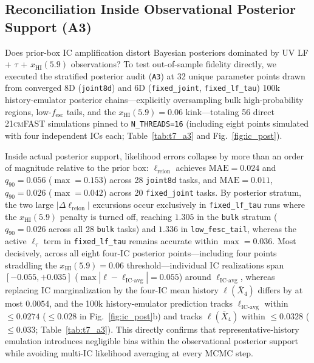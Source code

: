 \documentclass[aps,prd,reprint,superscriptaddress,nofootinbib,amsmath,amssymb,floatfix,longbibliography]{revtex4-2}
\begin{document}
\subsection{Reconciliation Inside Observational Posterior Support (A3)}\label{sec:a3}

Does prior-box IC amplification distort Bayesian posteriors dominated by UV LF + $\tau$ + $x_{\mathrm{HI}}(5.9)$ observations? To test out-of-sample fidelity directly, we executed the stratified posterior audit (\texttt{A3}) at 32 unique parameter points drawn from converged 8D (\texttt{joint8d}) and 6D (\texttt{fixed\_joint}, \texttt{fixed\_lf\_tau}) 100k history-emulator posterior chains---explicitly oversampling bulk high-probability regions, low-$f_{\mathrm{esc}}$ tails, and the $x_{\mathrm{HI}}(5.9)=0.06$ kink---totaling 56 direct \textsc{21cmFAST} simulations pinned to \texttt{N\_THREADS=16} (including eight points simulated with four independent ICs each; Table~\ref{tab:t7_a3} and Fig.~\ref{fig:ic_post}).

Inside actual posterior support, likelihood errors collapse by more than an order of magnitude relative to the prior box: $\ell_{\mathrm{reion}}$ achieves $\mathrm{MAE}=0.024$ and $q_{90}=0.056$ ($\max = 0.153$) across 28 \texttt{joint8d} tasks, and $\mathrm{MAE}=0.011$, $q_{90}=0.026$ ($\max = 0.042$) across 20 \texttt{fixed\_joint} tasks. By posterior stratum, the two large $|\Delta\ell_{\mathrm{reion}}|$ excursions occur exclusively in \texttt{fixed\_lf\_tau} runs where the $x_{\mathrm{HI}}(5.9)$ penalty is turned off, reaching $1.305$ in the \texttt{bulk} stratum ($q_{90}=0.026$ across all 28 \texttt{bulk} tasks) and $1.336$ in \texttt{low\_fesc\_tail}, whereas the active $\ell_{\tau}$ term in \texttt{fixed\_lf\_tau} remains accurate within $\max = 0.036$. Most decisively, across all eight four-IC posterior points---including four points straddling the $x_{\mathrm{HI}}(5.9)=0.06$ threshold---individual IC realizations span $[-0.055, +0.035]$ ($\max |\ell - \ell_{\mathrm{IC\text{-}avg}}| = 0.055$) around $\ell_{\mathrm{IC\text{-}avg}}$, whereas replacing IC marginalization by the four-IC mean history $\ell(\bar{X}_4)$ differs by at most $0.0054$, and the 100k history-emulator prediction tracks $\ell_{\mathrm{IC\text{-}avg}}$ within $\le 0.0274$ ($\le 0.028$ in Fig.~\ref{fig:ic_post}b) and tracks $\ell(\bar{X}_4)$ within $\le 0.0328$ ($\le 0.033$; Table~\ref{tab:t7_a3}). This directly confirms that representative-history emulation introduces negligible bias within the observational posterior support while avoiding multi-IC likelihood averaging at every MCMC step.
\end{document}
